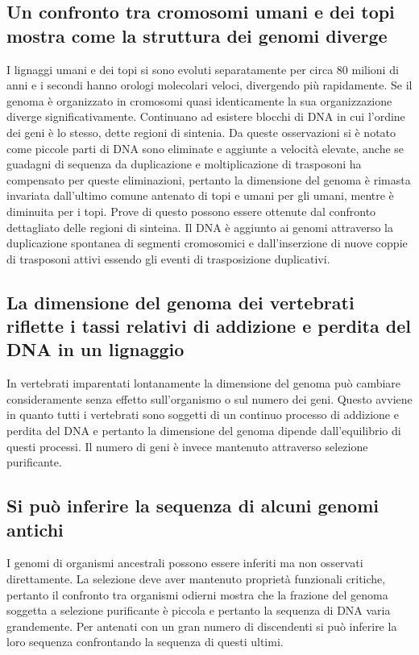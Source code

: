 \subsection{Un confronto tra cromosomi umani e dei topi mostra come la struttura dei genomi diverge}
I lignaggi umani e dei topi si sono evoluti separatamente per circa $80$ milioni di anni e i secondi hanno orologi molecolari veloci, divergendo pi\`u rapidamente. Se il genoma \`e 
organizzato in cromosomi quasi identicamente la sua organizzazione diverge significativamente. Continuano ad esistere blocchi di DNA in cui l'ordine dei geni \`e lo stesso, dette regioni
di sintenia. Da queste osservazioni si \`e notato come piccole parti di DNA sono eliminate e aggiunte a velocit\`a elevate, anche se guadagni di sequenza da duplicazione e moltiplicazione
di trasposoni ha compensato per queste eliminazioni, pertanto la dimensione del genoma \`e rimasta invariata dall'ultimo comune antenato di topi e umani per gli umani, mentre \`e 
diminuita per i topi. Prove di questo possono essere ottenute dal confronto dettagliato delle regioni di sinteina. Il DNA \`e aggiunto ai genomi attraverso la duplicazione spontanea
di segmenti cromosomici e dall'inserzione di nuove coppie di trasposoni attivi essendo gli eventi di trasposizione duplicativi. 
\subsection{La dimensione del genoma dei vertebrati riflette i tassi relativi di addizione e perdita del DNA in un lignaggio}
In vertebrati imparentati lontanamente la dimensione del genoma pu\`o cambiare consideramente senza effetto sull'organismo o sul numero dei geni. Questo avviene in quanto tutti i 
vertebrati sono soggetti di un continuo processo di addizione e perdita del DNA e pertanto la dimensione del genoma dipende dall'equilibrio di questi processi. Il numero di geni \`e 
invece mantenuto attraverso selezione purificante.
\subsection{Si pu\`o inferire la sequenza di alcuni genomi antichi}
I genomi di organismi ancestrali possono essere inferiti ma non osservati direttamente. La selezione deve aver mantenuto propriet\`a funzionali critiche, pertanto il confronto tra 
organismi odierni mostra che la frazione del genoma soggetta a selezione purificante \`e piccola e pertanto la sequenza di DNA varia grandemente. Per antenati con un gran numero di 
discendenti si pu\`o inferire la loro sequenza confrontando la sequenza di questi ultimi. 
